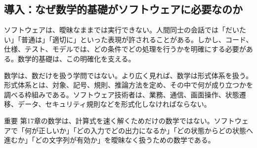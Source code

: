 \subsection{導入：なぜ数学的基礎がソフトウェアに必要なのか}
ソフトウェアは、曖昧なままでは実行できない。人間同士の会話では「だいたい」「普通は」「適切に」といった表現が許されることがある。しかし、コード、仕様、テスト、モデルでは、どの条件でどの処理を行うかを明確にする必要がある。数学的基礎は、この明確化を支える。

数学は、数だけを扱う学問ではない。より広く見れば、数学は形式体系を扱う。形式体系とは、対象、記号、規則、推論方法を定め、その中で何が成り立つかを調べる枠組みである。ソフトウェア技術者は、業務、通信、画面操作、状態遷移、データ、セキュリティ規則などを形式化しなければならない。

\begin{notebox}{重要}
第17章の数学は、計算式を速く解くためだけの数学ではない。ソフトウェアで「何が正しいか」「どの入力でどの出力になるか」「どの状態からどの状態へ進むか」「どの文字列が有効か」を曖昧なく扱うための数学である。
\end{notebox}
